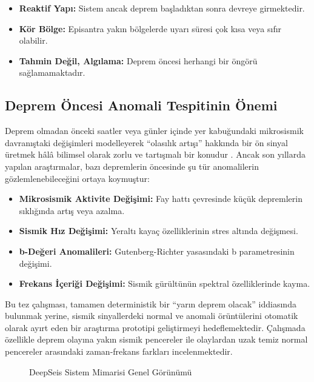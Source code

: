 \begin{itemize}
    \item \textbf{Reaktif Yapı:} Sistem ancak deprem başladıktan sonra devreye girmektedir.
    \item \textbf{Kör Bölge:} Episantra yakın bölgelerde uyarı süresi çok kısa veya sıfır olabilir.
    \item \textbf{Tahmin Değil, Algılama:} Deprem öncesi herhangi bir öngörü sağlamamaktadır.
\end{itemize}

\subsection{Deprem Öncesi Anomali Tespitinin Önemi}

Deprem olmadan önceki saatler veya günler içinde yer kabuğundaki mikrosismik davranıştaki değişimleri modelleyerek ``olasılık artışı'' hakkında bir ön sinyal üretmek hâlâ bilimsel olarak zorlu ve tartışmalı bir konudur \cite{geller1997earthquakes}. Ancak son yıllarda yapılan araştırmalar, bazı depremlerin öncesinde şu tür anomalilerin gözlemlenebileceğini ortaya koymuştur:

\begin{itemize}
    \item \textbf{Mikrosismik Aktivite Değişimi:} Fay hattı çevresinde küçük depremlerin sıklığında artış veya azalma.
    \item \textbf{Sismik Hız Değişimi:} Yeraltı kayaç özelliklerinin stres altında değişmesi.
    \item \textbf{b-Değeri Anomalileri:} Gutenberg-Richter yasasındaki b parametresinin değişimi.
    \item \textbf{Frekans İçeriği Değişimi:} Sismik gürültünün spektral özelliklerinde kayma.
\end{itemize}

Bu tez çalışması, tamamen deterministik bir ``yarın deprem olacak'' iddiasında bulunmak yerine, sismik sinyallerdeki normal ve anomali örüntülerini otomatik olarak ayırt eden bir araştırma prototipi geliştirmeyi hedeflemektedir. Çalışmada özellikle deprem olayına yakın sismik pencereler ile olaylardan uzak temiz normal pencereler arasındaki zaman-frekans farkları incelenmektedir.

\begin{figure}[htbp]
    \centering
    \caption{DeepSeis Sistem Mimarisi Genel Görünümü}
    \label{fig:sistem_mimarisi}
\end{figure}

